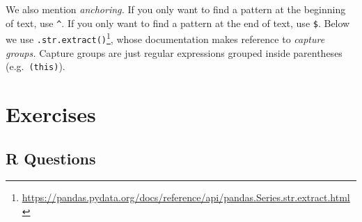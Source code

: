 \documentclass[12pt,krantz2]{krantz}
\makeatletter
\newenvironment{Shaded}{\begin{snugshade}}{\end{snugshade}}
\newcommand{\BuiltInTok}[1]{#1}
\newcommand{\CommentTok}[1]{\textcolor[rgb]{0.37,0.37,0.37}{\textit{#1}}}
\newcommand{\NormalTok}[1]{#1}
\newcommand{\OperatorTok}[1]{\textcolor[rgb]{0.43,0.43,0.43}{\textbf{#1}}}
\newcommand{\StringTok}[1]{\textcolor[rgb]{0.5,0.5,0.5}{#1}}
\newcommand{\VerbatimStringTok}[1]{\textcolor[rgb]{0.5,0.5,0.5}{#1}}
\renewcommand{\href}[2]{#2\footnote{\url{#1}}}
\newenvironment{kframe}{%
\medskip{}
\setlength{\fboxsep}{.8em}
 \def\at@end@of@kframe{}%
 \ifinner\ifhmode%
  \def\at@end@of@kframe{\end{minipage}}%
  \begin{minipage}{\columnwidth}%
 \fi\fi%
 \def\FrameCommand##1{\hskip\@totalleftmargin \hskip-\fboxsep
 \colorbox{shadecolor}{##1}\hskip-\fboxsep
     \hskip-\linewidth \hskip-\@totalleftmargin \hskip\columnwidth}%
 \MakeFramed {\advance\hsize-\width
   \@totalleftmargin\z@ \linewidth\hsize
   \@setminipage}}%
 {\par\unskip\endMakeFramed%
 \at@end@of@kframe}
\renewenvironment{Shaded}{\begin{kframe}}{\end{kframe}}
\makeatother
\begin{document}
We also mention \emph{anchoring.} If you only want to find a pattern at the beginning of text, use \texttt{\^{}}. If you only want to find a pattern at the end of text, use \texttt{\$}. Below we use \href{https://pandas.pydata.org/docs/reference/api/pandas.Series.str.extract.html}{\texttt{.str.extract()}}, whose documentation makes reference to \emph{capture groups.} Capture groups are just regular expressions grouped inside parentheses (e.g.~\texttt{(this)}).

\begin{Shaded}
\end{Shaded}

\hypertarget{exercises-1}{%
\section{Exercises}\label{exercises-1}}

\hypertarget{r-questions-1}{%
\subsection{R Questions}\label{r-questions-1}}
\end{document}
